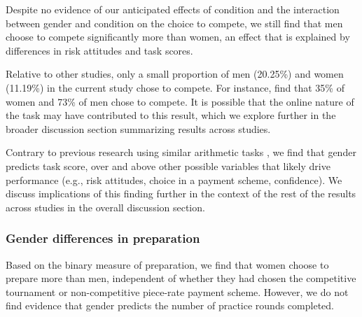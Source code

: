\documentclass[letterpaper, nobind]{templates/ociamthesis}
\begin{document}
Despite no evidence of our anticipated effects of condition and the interaction between gender and condition on the choice to compete, we still find that men choose to compete significantly more than women, an effect that is explained by differences in risk attitudes and task scores.

Relative to other studies, only a small proportion of men (20.25\%) and women (11.19\%) in the current study chose to compete. For instance, \textcite{Niederle2007} find that 35\% of women and 73\% of men chose to compete. It is possible that the online nature of the task may have contributed to this result, which we explore further in the broader discussion section summarizing results across studies.

Contrary to previous research using similar arithmetic tasks \autocite[see review in][]{Niederle2011}, we find that gender predicts task score, over and above other possible variables that likely drive performance (e.g., risk attitudes, choice in a payment scheme, confidence). We discuss implications of this finding further in the context of the rest of the results across studies in the overall discussion section.

\hypertarget{gender-differences-in-preparation-1}{%
\subsubsection{Gender differences in preparation}\label{gender-differences-in-preparation-1}}

Based on the binary measure of preparation, we find that women choose to prepare more than men, independent of whether they had chosen the competitive tournament or non-competitive piece-rate payment scheme. However, we do not find evidence that gender predicts the number of practice rounds completed.
\end{document}
